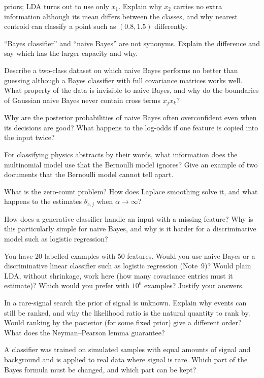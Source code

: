 \documentclass[11pt]{article}
\begin{document}
\begin{questions}
\begin{conceptual}
priors; LDA turns out to use only $x_1$. Explain why $x_2$ carries no extra information although its mean differs between
the classes, and why nearest centroid can classify a point such as $(0.8, 1.5)$ differently.
\item ``Bayes classifier'' and ``naive Bayes'' are not synonyms. Explain the difference and say which has the larger
capacity and why.
\item Describe a two-class dataset on which naive Bayes performs no better than guessing although a Bayes classifier
with full covariance matrices works well. What property of the data is invisible to naive Bayes, and why do the
boundaries of Gaussian naive Bayes never contain cross terms $x_j x_k$?
\item Why are the posterior probabilities of naive Bayes often overconfident even when its decisions are good? What
happens to the log-odds if one feature is copied into the input twice?
\item For classifying physics abstracts by their words, what information does the multinomial model use that the
Bernoulli model ignores? Give an example of two documents that the Bernoulli model cannot tell apart.
\item What is the zero-count problem? How does Laplace smoothing solve it, and what happens to the estimates
$\hat\theta_{c,j}$ when $\alpha \to \infty$?
\item How does a generative classifier handle an input with a missing feature? Why is this particularly simple for naive
Bayes, and why is it harder for a discriminative model such as logistic regression?
\item You have 20 labelled examples with 50 features. Would you use naive Bayes or a discriminative linear classifier
such as logistic regression (Note~9)? Would plain LDA, without shrinkage, work here (how many covariance entries must it
estimate)? Which would you prefer with $10^6$ examples? Justify your answers.
\item In a rare-signal search the prior of signal is unknown. Explain why events can still be ranked, and why the
likelihood ratio is the natural quantity to rank by. Would ranking by the posterior (for some fixed prior) give a
different order? What does the Neyman--Pearson lemma guarantee?
\item A classifier was trained on simulated samples with equal amounts of signal and background and is applied to real
data where signal is rare. Which part of the Bayes formula must be changed, and which part can be kept?

\end{conceptual}
\end{questions}
\end{document}
